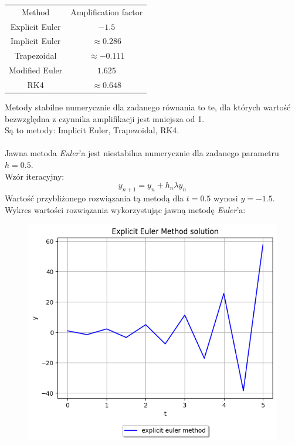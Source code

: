 \documentclass{article}
\begin{document}
\begin{center}
  \begin{tabular}{c c} 
   Method & Amplification factor\\
   Explicit Euler & $-1.5$\\
   Implicit Euler & $\approx 0.286$\\
   Trapezoidal  & $\approx -0.111$\\
   Modified Euler & $1.625$\\
   RK4 & $\approx 0.648$
  \end{tabular}
\end{center}

Metody stabilne numerycznie dla zadanego równania to te, dla których
wartość bezwzględna z czynnika amplifikacji jest mniejsza od 1.\\
Są to metody: Implicit Euler, Trapezoidal, RK4.\\\\

Jawna metoda \textit{Euler}'a jest niestabilna numerycznie dla zadanego
parametru $h=0.5$.\\
Wzór iteracyjny:
$$y_{n+1} = y_n + h_n\lambda y_n$$
Wartość przybliżonego rozwiązania tą metodą dla $t=0.5$ wynosi
$y=-1.5$.\\

Wykres wartości rozwiązania wykorzystując jawną metodę \textit{Euler}'a:
\begin{figure}[H]
  \includegraphics[width=\linewidth]{figures/explicit.png}
\end{figure}
\end{document}
